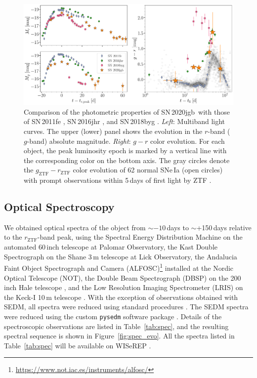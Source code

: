 \documentclass[twocolumn]{aastex631}
\newcommand{\sn}{SN\,2020jgb}
\begin{document}
\begin{figure}
    \centering
    \includegraphics[width=\textwidth]{photometry.pdf}
    \caption{Comparison of the photometric properties of \sn\ with those of SN\,2011fe \citep[normal SN\,Ia;][]{Pereira_2013}, SN\,2016jhr \citep[normal-luminosity He-shell DDet;][]{jiang_16jhr_2017}, and SN\,2018byg \citep[subluminous He-shell DDet;][]{de_18byg_2019}. \textit{Left}: Multiband light curves. The upper (lower) panel shows the evolution in the $r$-band ($g$-band) absolute magnitude. \textit{Right}: $g-r$ color evolution. For each object, the peak luminosity epoch is marked by a vertical line with the corresponding color on the bottom axis. The gray circles denote the $g_\mathrm{ZTF}-r_\mathrm{ZTF}$ color evolution of 62 normal SNe\,Ia (open circles) with prompt observations within 5\,days of first light by ZTF \citep{Bulla2020}. }
    \label{fig:photometry}
\end{figure}

\subsection{Optical Spectroscopy}\label{sec:optical_spec}
We obtained optical spectra of the object from $\sim$$-10$\,days to $\sim$+150\,days relative to the $r_\mathrm{ZTF}$-band peak, using the Spectral Energy Distribution Machine \citep[SEDM;][]{SEDM_2018} on the automated 60\,inch telescope \citep[P60;][]{P60_2006} at Palomar Observatory, the Kast Double Spectrograph \citep{miller1994kast} on the Shane 3\,m telescope at Lick Observatory, the Andalucia Faint Object Spectrograph and Camera (ALFOSC)\footnote{\url{https://www.not.iac.es/instruments/alfosc/}} installed at the Nordic Optical Telescope (NOT), the Double Beam Spectrograph (DBSP) on the 200\,inch Hale telescope \citep[P200;][]{P200_1982}, and the Low Resolution Imaging Spectrometer (LRIS) on the Keck-I 10\,m telescope \citep{Keck_1995}. With the exception of observations obtained with SEDM, all spectra were reduced using standard procedures \citep[e.g.,][]{Matheson_2000}. The SEDM spectra were reduced using the custom \texttt{pysedm} software package \citep{Rigault_pysedm_2019}. Details of the spectroscopic observations are listed in Table~\ref{tab:spec}, and the resulting spectral sequence is shown in Figure~\ref{fig:spec_evo}. All the spectra listed in Table~\ref{tab:spec} will be available on WISeREP \citep{wiserep_2012}.
\end{document}
